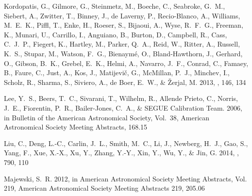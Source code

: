 \documentclass[12pt, preprint]{aastex}
\begin{document}
\begin{thebibliography}{24}
{Kordopatis}, G., {Gilmore}, G., {Steinmetz}, M., {Boeche}, C., {Seabroke},
  G.~M., {Siebert}, A., {Zwitter}, T., {Binney}, J., {de Laverny}, P.,
  {Recio-Blanco}, A., {Williams}, M.~E.~K., {Piffl}, T., {Enke}, H., {Roeser},
  S., {Bijaoui}, A., {Wyse}, R.~F.~G., {Freeman}, K., {Munari}, U., {Carrillo},
  I., {Anguiano}, B., {Burton}, D., {Campbell}, R., {Cass}, C.~J.~P.,
  {Fiegert}, K., {Hartley}, M., {Parker}, Q.~A., {Reid}, W., {Ritter}, A.,
  {Russell}, K.~S., {Stupar}, M., {Watson}, F.~G., {Bienaym{\'e}}, O.,
  {Bland-Hawthorn}, J., {Gerhard}, O., {Gibson}, B.~K., {Grebel}, E.~K.,
  {Helmi}, A., {Navarro}, J.~F., {Conrad}, C., {Famaey}, B., {Faure}, C.,
  {Just}, A., {Kos}, J., {Matijevi{\v c}}, G., {McMillan}, P.~J., {Minchev},
  I., {Scholz}, R., {Sharma}, S., {Siviero}, A., {de Boer}, E.~W., \& {{\v
  Z}erjal}, M. 2013, \aj, 146, 134

{Lee}, Y.~S., {Beers}, T.~C., {Sivarani}, T., {Wilhelm}, R., {Allende Prieto},
  C., {Norris}, J.~E., {Fiorentin}, P.~R., {Bailer-Jones}, C.~A., \& {SEGUE
  Calibration Team}. 2006, in Bulletin of the American Astronomical Society,
  Vol.~38, American Astronomical Society Meeting Abstracts, 168.15

{Liu}, C., {Deng}, L.-C., {Carlin}, J.~L., {Smith}, M.~C., {Li}, J., {Newberg},
  H.~J., {Gao}, S., {Yang}, F., {Xue}, X.-X., {Xu}, Y., {Zhang}, Y.-Y., {Xin},
  Y., {Wu}, Y., \& {Jin}, G. 2014, \apj, 790, 110

{Majewski}, S.~R. 2012, in American Astronomical Society Meeting Abstracts,
  Vol. 219, American Astronomical Society Meeting Abstracts 219, 205.06


\end{thebibliography}
\end{document}
